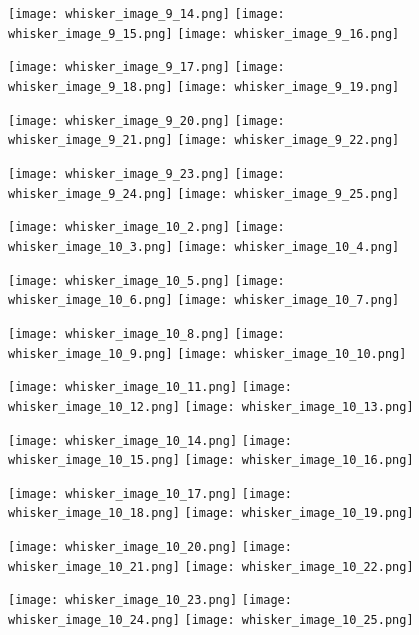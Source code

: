 \documentclass[12pt]{article}
\begin{document}
\begin{figure}
	\centerline{
		\texttt{[image: whisker\_image\_9\_14.png]}
		\texttt{[image: whisker\_image\_9\_15.png]}
		\texttt{[image: whisker\_image\_9\_16.png]}
	}
	\centerline{
		\texttt{[image: whisker\_image\_9\_17.png]}
		\texttt{[image: whisker\_image\_9\_18.png]}
		\texttt{[image: whisker\_image\_9\_19.png]}
	}
	\centerline{
		\texttt{[image: whisker\_image\_9\_20.png]}
		\texttt{[image: whisker\_image\_9\_21.png]}
		\texttt{[image: whisker\_image\_9\_22.png]}
	}
	\centerline{
		\texttt{[image: whisker\_image\_9\_23.png]}
		\texttt{[image: whisker\_image\_9\_24.png]}
		\texttt{[image: whisker\_image\_9\_25.png]}
	}
\end{figure}

\begin{figure}
	\centerline{
		\texttt{[image: whisker\_image\_10\_2.png]}
		\texttt{[image: whisker\_image\_10\_3.png]}
		\texttt{[image: whisker\_image\_10\_4.png]}
	}
	\centerline{
		\texttt{[image: whisker\_image\_10\_5.png]}
		\texttt{[image: whisker\_image\_10\_6.png]}
		\texttt{[image: whisker\_image\_10\_7.png]}
	}
	\centerline{
		\texttt{[image: whisker\_image\_10\_8.png]}
		\texttt{[image: whisker\_image\_10\_9.png]}
		\texttt{[image: whisker\_image\_10\_10.png]}
	}
	\centerline{
		\texttt{[image: whisker\_image\_10\_11.png]}
		\texttt{[image: whisker\_image\_10\_12.png]}
		\texttt{[image: whisker\_image\_10\_13.png]}
	}
\end{figure}

\begin{figure}
	\centerline{
		\texttt{[image: whisker\_image\_10\_14.png]}
		\texttt{[image: whisker\_image\_10\_15.png]}
		\texttt{[image: whisker\_image\_10\_16.png]}
	}
	\centerline{
		\texttt{[image: whisker\_image\_10\_17.png]}
		\texttt{[image: whisker\_image\_10\_18.png]}
		\texttt{[image: whisker\_image\_10\_19.png]}
	}
	\centerline{
		\texttt{[image: whisker\_image\_10\_20.png]}
		\texttt{[image: whisker\_image\_10\_21.png]}
		\texttt{[image: whisker\_image\_10\_22.png]}
	}
	\centerline{
		\texttt{[image: whisker\_image\_10\_23.png]}
		\texttt{[image: whisker\_image\_10\_24.png]}
		\texttt{[image: whisker\_image\_10\_25.png]}
	}
\end{figure}
\end{document}
